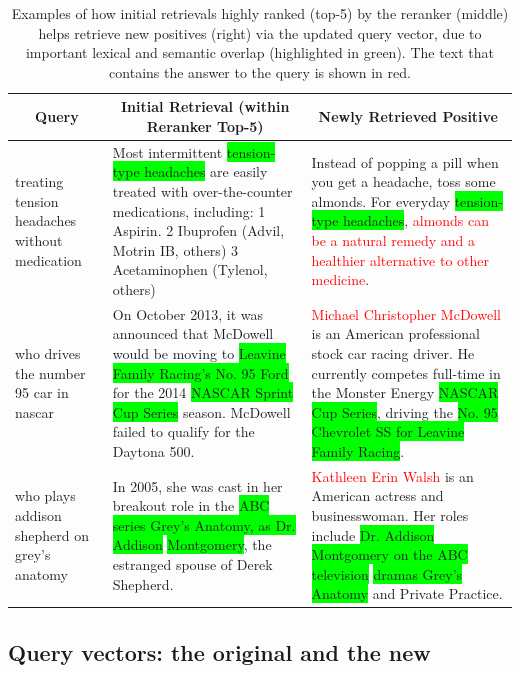 \begin{table}[t]
    \scriptsize
    \centering
    \def\arraystretch{1.3}
    \begin{tabular}{p{7em}|p{21em}|p{25em}}
    \multicolumn{1}{c|}{\textbf{Query}} & \multicolumn{1}{c|}{\textbf{Initial Retrieval (within Reranker Top-5)}}& \multicolumn{1}{c}{\textbf{Newly Retrieved Positive}} \\
    \hline
    treating tension headaches without medication & Most intermittent \colorbox{lime}{tension-type headaches} are easily treated with over-the-counter medications, including: 1 Aspirin. 2 Ibuprofen (Advil, Motrin IB, others) 3 Acetaminophen (Tylenol, others) & Instead of popping a pill when you get a headache, toss some almonds. For everyday \colorbox{lime}{tension-type headaches}, \textcolor{red}{almonds can be a natural remedy and a healthier alternative to other medicine}. \\
    \hline
    who drives the number 95 car in nascar & On October 2013, it was announced that McDowell would be moving to \colorbox{lime}{Leavine Family Racing's No. 95 Ford} for the 2014 \colorbox{lime}{NASCAR Sprint Cup Series} season. McDowell failed to qualify for the Daytona 500. & \textcolor{red}{Michael Christopher McDowell} is an American professional stock car racing driver. He currently competes full-time in the Monster Energy \colorbox{lime}{NASCAR Cup Series}, driving the \colorbox{lime}{No. 95 Chevrolet SS for Leavine Family Racing}. \\
    \hline
    who plays addison shepherd on grey's anatomy & In 2005, she was cast in her breakout role in the \colorbox{lime}{ABC series Grey's Anatomy, as Dr. Addison} \colorbox{lime}{Montgomery}, the estranged spouse of Derek Shepherd. & \textcolor{red}{Kathleen Erin Walsh} is an American actress and businesswoman. Her roles include \colorbox{lime}{Dr. Addison Montgomery on the ABC television} \colorbox{lime}{dramas Grey's Anatomy} and Private Practice.\\
    \hline
    \end{tabular}
    \caption{Examples of how initial retrievals highly ranked (top-5) by the reranker (middle) helps retrieve new positives (right) via the updated query vector, due to important lexical and semantic overlap (highlighted in green). The text that contains the answer to the query is shown in red.} 
    \label{tab:examples}
\end{table}


\subsection{Query vectors: the original and the new}
\label{sec:query-vectors-orig-new}

